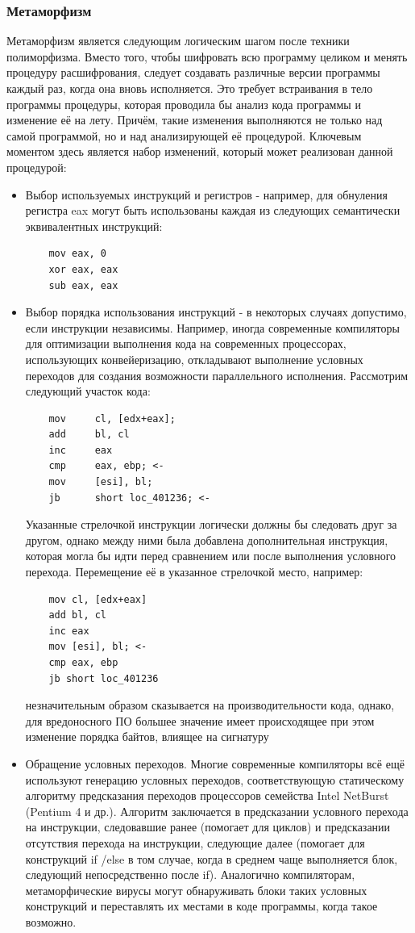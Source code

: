 \subsubsection {Метаморфизм}
Метаморфизм является следующим логическим шагом после техники полиморфизма. Вместо того, чтобы шифровать всю программу целиком и менять процедуру расшифрования, следует создавать различные версии программы каждый раз, когда она вновь исполняется. Это требует встраивания в тело программы процедуры, которая проводила бы анализ кода программы и изменение её на лету. Причём, такие изменения выполняются не только над самой программой, но и над анализирующей её процедурой. Ключевым моментом здесь является набор изменений, который может реализован данной процедурой:
\lstset{style=masm}

\begin {itemize}
	\item Выбор используемых инструкций и регистров - например, для обнуления регистра eax могут быть использованы каждая из следующих семантически эквивалентных инструкций:
	\begin{lstlisting}
	mov eax, 0
	xor eax, eax
	sub eax, eax
	\end{lstlisting}
	\item Выбор порядка использования инструкций - в некоторых случаях допустимо, если инструкции независимы. Например, иногда современные компиляторы для оптимизации выполнения кода на современных процессорах, использующих конвейеризацию, откладывают выполнение условных переходов для создания возможности параллельного исполнения. Рассмотрим следующий участок кода:
	\begin{lstlisting}
	mov     cl, [edx+eax];
	add     bl, cl
	inc     eax
	cmp     eax, ebp; <-
	mov     [esi], bl;
	jb      short loc_401236; <-
	\end{lstlisting}
	Указанные стрелочкой инструкции логически должны бы следовать друг за другом, однако между ними была добавлена дополнительная инструкция, которая могла бы идти перед сравнением или после выполнения условного перехода. Перемещение её в указанное стрелочкой место, например:
	\begin{lstlisting}
	mov cl, [edx+eax]
	add bl, cl
	inc eax
	mov [esi], bl; <-
	cmp eax, ebp
	jb short loc_401236
	\end{lstlisting}
незначительным образом сказывается на производительности кода, однако, для вредоносного ПО большее значение имеет происходящее при этом изменение порядка байтов, влиящее на сигнатуру
	\item Обращение условных переходов. Многие современные компиляторы всё ещё используют генерацию условных переходов, соответствующую статическому алгоритму предсказания переходов процессоров семейства Intel NetBurst (Pentium 4 и др.)\cite{INTELMANUAL}. Алгоритм заключается в предсказании условного перехода на инструкции, следовавшие ранее (помогает для циклов) и предсказании отсутствия перехода на инструкции, следующие далее (помогает для конструкций if /else в том случае, когда в среднем чаще выполняется блок, следующий непосредственно после if). Аналогично компиляторам, метаморфические вирусы могут обнаруживать блоки таких условных конструкций и переставлять их местами в коде программы, когда такое возможно.


\end{itemize}
